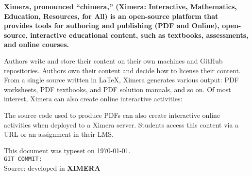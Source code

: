   \pagestyle{empty}
  \pagecolor{otherbkgndcr}
  \boldmath %
  \bfseries %
  \color{txtcr}
  \sffamily\flushleft%
  Ximera, pronounced ``chimera,'' (\textbf{X}imera: \textbf{I}nteractive,
  \textbf{M}athematics, \textbf{E}ducation,
  \textbf{R}esources, for \textbf{A}ll) is an open-source platform that provides
  tools for
  authoring and publishing (PDF and Online), open-source, interactive educational
  content, such as textbooks, assessments, and online courses.
  
  
  Authors  write and store their content on their own
  machines and GitHub repositories.
  Authors own their content and decide how to license their content. From a
  single source written in \LaTeX, Ximera generates various output: PDF
  worksheets,
  PDF textbooks, and	PDF solution manuals, and so on. Of most interest,
  Ximera can
  also create online interactive activities:
  \begin{center}
  \end{center}
  The source code used to produce PDFs can also create interactive online
  activities when deployed to a Ximera server. Students access this content via a
  URL or an assignment in their LMS.
  
\vfill

  \small This document was typeset on \today. \hfill \Large\textsf{\ccbyncsa}\\
  \small\texttt{GIT COMMIT: }\\
  \small Source: {\hypersetup{allcolors=txtcr}\docURL}\hfill developed in \textbf{XIMERA}
